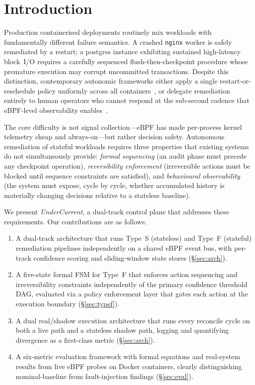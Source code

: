 \documentclass[runningheads]{llncs}
\begin{document}

\section{Introduction}
\label{sec:intro}

Production containerised deployments routinely mix workloads with
fundamentally different failure semantics. A crashed \texttt{nginx}
worker is safely remediated by a restart; a postgres instance exhibiting
sustained high-latency block~I/O requires a carefully sequenced
flush-then-checkpoint procedure whose premature execution may corrupt
uncommitted transactions. Despite this distinction, contemporary
autonomic frameworks either apply a single restart-or-reschedule policy
uniformly across all containers~\cite{burnsk8s}, or delegate
remediation entirely to human operators who cannot respond at the
sub-second cadence that eBPF-level observability enables~\cite{bcc}.

The core difficulty is not signal collection---eBPF has made per-process
kernel telemetry cheap and always-on---but rather decision safety.
Autonomous remediation of stateful workloads requires three properties
that existing systems do not simultaneously provide: \textit{formal
sequencing} (an audit phase must precede any checkpoint operation),
\textit{reversibility enforcement} (irreversible actions must be
blocked until sequence constraints are satisfied), and
\textit{behavioural observability} (the system must expose, cycle by
cycle, whether accumulated history is materially changing decisions
relative to a stateless baseline).

We present \textit{UnderCurrent}, a dual-track control plane that
addresses these requirements. Our contributions are as follows.

\begin{enumerate}
\item A dual-track architecture that runs Type~S (stateless) and
Type~F (stateful) remediation pipelines independently on a shared
eBPF event bus, with per-track confidence scoring and sliding-window
state stores (\S\ref{sec:arch}).
\item A five-state formal FSM for Type~F that enforces action sequencing
and irreversibility constraints independently of the primary confidence
threshold DAG, evaluated via a policy enforcement layer that gates each
action at the execution boundary (\S\ref{sec:typef}).
\item A dual real/shadow execution architecture that runs every
reconcile cycle on both a live path and a stateless shadow path,
logging and quantifying divergence as a first-class metric (\S\ref{sec:arch}).
\item A six-metric evaluation framework with formal equations and
real-system results from live eBPF probes on Docker containers,
clearly distinguishing nominal-baseline from fault-injection findings
(\S\ref{sec:eval}).
\end{enumerate}
\end{document}
